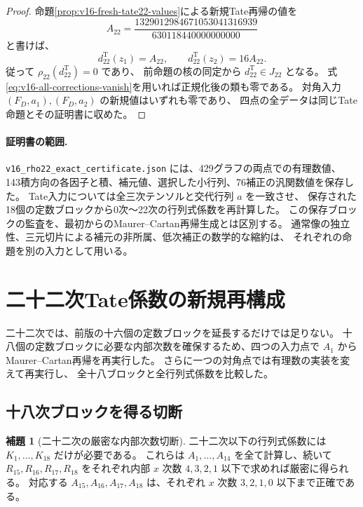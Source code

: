 \documentclass[a4paper,11pt]{ltjsarticle}
\theoremstyle{definition}
\newtheorem{lemma}[theorem]{補題}
\begin{document}
\begin{proof}
命題\ref{prop:v16-fresh-tate22-values}による新規Tate再帰の値を
\[
 A_{22}=\frac{1329012984671053041316939}{630118440000000000}
\]
と書けば、
\[
             d_{22}^{\mathrm T}(z_1)=A_{22},\qquad
             d_{22}^{\mathrm T}(z_2)=16A_{22}.
\]
従って $\rho_{22}(d_{22}^{\mathrm T})=0$ であり、
前命題の核の同定から $d_{22}^{\mathrm T}\in J_{22}$ となる。
式\eqref{eq:v16-all-corrections-vanish}を用いれば正規化後の類も零である。
対角入力 $(F_D,a_1),(F_D,a_2)$ の新規値はいずれも零であり、
四点の全データは同じTate命題とその証明書に収めた。
\end{proof}

\paragraph{証明書の範囲.}
\nolinkurl{v16_rho22_exact_certificate.json} には、429グラフの両点での有理数値、
143積方向の各因子と積、補元値、選択した小行列、76補正の汎関数値を保存した。
Tate入力については全三次テンソルと交代行列 $a$ を一致させ、
保存された18個の定数ブロックから0次〜22次の行列式係数を再計算した。
この保存ブロックの監査を、最初からのMaurer--Cartan再帰生成とは区別する。
通常像の独立性、三元切片による補元の非所属、低次補正の数学的な縮約は、
それぞれの命題を別の入力として用いる。



\section{二十二次Tate係数の新規再構成}
\label{sec:v16-tate-twentysecond}

二十二次では、前版の十六個の定数ブロックを延長するだけでは足りない。
十八個の定数ブロックに必要な内部次数を確保するため、四つの入力点で
$A_1$ からMaurer--Cartan再帰を再実行した。
さらに一つの対角点では有理数の実装を変えて再実行し、
全十八ブロックと全行列式係数を比較した。

\subsection{十八次ブロックを得る切断}

\begin{lemma}[二十二次の厳密な内部次数切断]
\label{lem:v16-tate22-truncation}
二十二次以下の行列式係数には $K_1,\ldots,K_{18}$ だけが必要である。
これらは $A_1,\ldots,A_{14}$ を全て計算し、続いて
$R_{15},R_{16},R_{17},R_{18}$ をそれぞれ内部 $x$ 次数
$4,3,2,1$ 以下で求めれば厳密に得られる。
対応する $A_{15},A_{16},A_{17},A_{18}$ は、それぞれ
$x$ 次数 $3,2,1,0$ 以下まで正確である。
\end{lemma}
\end{document}
